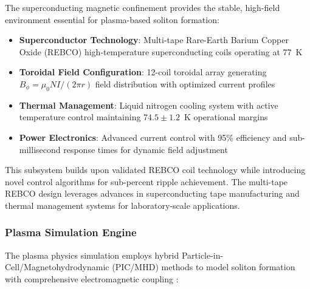 \documentclass[12pt,a4paper]{article}
\begin{document}
The superconducting magnetic confinement provides the stable, high-field environment essential for plasma-based soliton formation:

\begin{itemize}
\item \textbf{Superconductor Technology}: Multi-tape Rare-Earth Barium Copper Oxide (REBCO) high-temperature superconducting coils operating at 77~K
\item \textbf{Toroidal Field Configuration}: 12-coil toroidal array generating $B_\phi = \mu_0 NI/(2\pi r)$ field distribution with optimized current profiles
\item \textbf{Thermal Management}: Liquid nitrogen cooling system with active temperature control maintaining $74.5 \pm 1.2$~K operational margins
\item \textbf{Power Electronics}: Advanced current control with 95\% efficiency and sub-millisecond response times for dynamic field adjustment
\end{itemize}

This subsystem builds upon validated REBCO coil technology \cite{senatore2014progress} while introducing novel control algorithms for sub-percent ripple achievement. The multi-tape REBCO design leverages advances in superconducting tape manufacturing and thermal management systems \cite{freidberg2014plasma} for laboratory-scale applications.

\subsubsection{Plasma Simulation Engine}

The plasma physics simulation employs hybrid Particle-in-Cell/Magnetohydrodynamic (PIC/MHD) methods to model soliton formation with comprehensive electromagnetic coupling \cite{freidberg2014plasma}:
\end{document}
